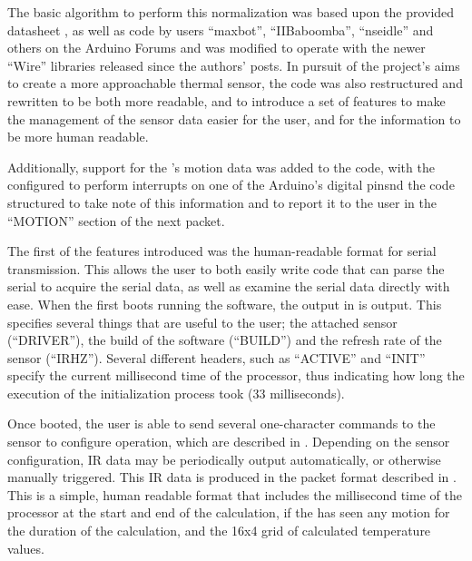 \documentclass[../thesis/thesis.tex]{subfiles}
\begin{document}
The basic algorithm to perform this normalization was based upon the provided datasheet \cite{MLXDatasheet}, as well as code by users ``maxbot'', ``IIBaboomba'', ``nseidle'' and others on the Arduino Forums \cite{ArduinoForum} and was modified to operate with the newer \ard ``Wire'' \iic libraries released since the authors' posts. In pursuit of the project's aims to create a more approachable thermal sensor, the code was also restructured and rewritten to be both more readable, and to introduce a set of features to make the management of the sensor data easier for the user, and for the information to be more human readable.

Additionally, support for the \pir's motion data was added to the code, with the \pir configured to perform interrupts on one of the Arduino's digital pinsnd the code structured to take note of this information and to report it to the user in the ``MOTION'' section of the next packet.

The first of the features introduced was the human-readable format for serial transmission. This allows the user to both easily write code that can parse the serial to acquire the serial data, as well as examine the serial data directly with ease. When the \ard first boots running the software, the output in  is output. This specifies several things that are useful to the user; the attached sensor (``DRIVER''), the build of the software (``BUILD'') and the refresh rate of the sensor (``IRHZ''). Several different headers, such as ``ACTIVE'' and ``INIT'' specify the current millisecond time of the processor, thus indicating how long the execution of the initialization process took (33 milliseconds).

Once booted, the user is able to send several one-character commands to the sensor to configure operation, which are described in . Depending on the sensor configuration, IR data may be periodically output automatically, or otherwise manually triggered. This IR data is produced in the packet format described in . This is a simple, human readable format that includes the millisecond time of the processor at the start and end of the calculation, if the \pir has seen any motion for the duration of the calculation, and the 16x4 grid of calculated temperature values.
\end{document}
